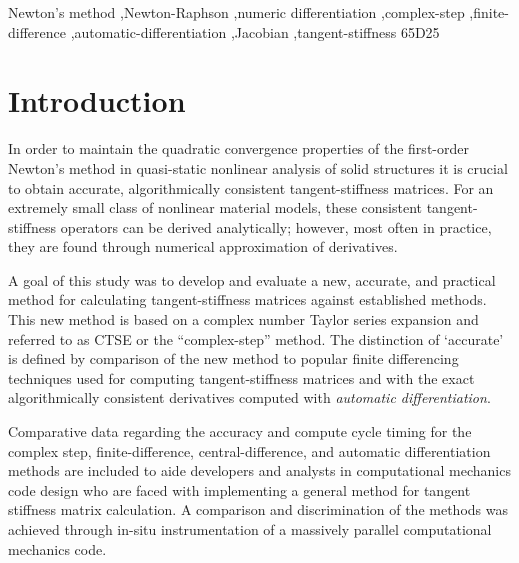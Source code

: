 \documentclass[preprint,12pt]{elsarticle}
\begin{document}
\begin{frontmatter}
\begin{keyword}
Newton's method \sep Newton-Raphson \sep numeric differentiation \sep complex-step \sep finite-difference \sep automatic-differentiation \sep Jacobian \sep tangent-stiffness
\MSC [2010] 65D25 
\end{keyword}

\end{frontmatter}




\section{Introduction}
\label{sec:intro} 

In order to maintain the quadratic convergence properties of the first-order Newton's method in quasi-static nonlinear analysis of solid structures it is crucial to obtain accurate, algorithmically consistent tangent-stiffness matrices. For an extremely small class of nonlinear material models, these consistent tangent-stiffness operators can be derived analytically; however, most often in practice, they are found through numerical approximation of derivatives. 

A goal of this study was to develop and evaluate a new, accurate, and practical method for calculating tangent-stiffness matrices against established methods.  This new method is based on a complex number Taylor series expansion and referred to as CTSE or the ``complex-step'' method.  The
distinction of `accurate' is defined by comparison of the new method to popular finite differencing techniques used for computing tangent-stiffness matrices and with the exact algorithmically consistent derivatives computed with \emph{automatic differentiation}.

Comparative data regarding the accuracy and compute cycle timing for the complex step, finite-difference, central-difference, and automatic differentiation methods are included to aide developers and analysts in computational mechanics code design who are faced with implementing a general method for tangent stiffness matrix calculation.  A comparison and discrimination of the methods was achieved through in-situ instrumentation of a massively parallel computational mechanics code.   
\end{document}
